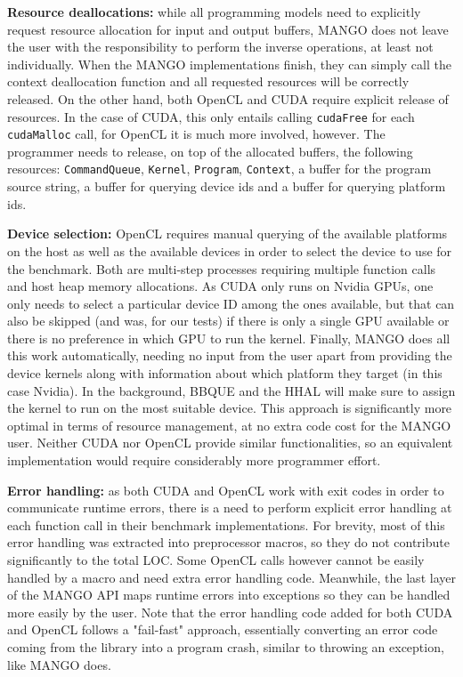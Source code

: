 \textbf{Resource deallocations:} while all programming models need to explicitly request resource allocation for input and output buffers, MANGO does not leave the user with the responsibility to perform the inverse operations, at least not individually. When the MANGO implementations finish, they can simply call the context deallocation function and all requested resources will be correctly released. On the other hand, both OpenCL and CUDA require explicit release of resources. In the case of CUDA, this only entails calling \texttt{cudaFree} for each \texttt{cudaMalloc} call, for OpenCL it is much more involved, however. The programmer needs to release, on top of the allocated buffers, the following resources: \texttt{CommandQueue}, \texttt{Kernel}, \texttt{Program}, \texttt{Context}, a buffer for the program source string, a buffer for querying device ids and a buffer for querying platform ids.

\textbf{Device selection:} OpenCL requires manual querying of the available platforms on the host as well as the available devices in order to select the device to use for the benchmark. Both are multi-step processes requiring multiple function calls and host heap memory allocations. As CUDA only runs on Nvidia GPUs, one only needs to select a particular device ID among the ones available, but that can also be skipped (and was, for our tests) if there is only a single GPU available or there is no preference in which GPU to run the kernel. Finally, MANGO does all this work automatically, needing no input from the user apart from providing the device kernels along with information about which platform they target (in this case Nvidia). In the background, BBQUE and the HHAL will make sure to assign the kernel to run on the most suitable device. This approach is significantly more optimal in terms of resource management, at no extra code cost for the MANGO user. Neither CUDA nor OpenCL provide similar functionalities, so an equivalent implementation would require considerably more programmer effort.

\textbf{Error handling:} as both CUDA and OpenCL work with exit codes in order to communicate runtime errors, there is a need to perform explicit error handling at each function call in their benchmark implementations. For brevity, most of this error handling was extracted into preprocessor macros, so they do not contribute significantly to the total LOC. Some OpenCL calls however cannot be easily handled by a macro and need extra error handling code. Meanwhile, the last layer of the MANGO API maps runtime errors into exceptions so they can be handled more easily by the user. Note that the error handling code added for both CUDA and OpenCL follows a "fail-fast" approach, essentially converting an error code coming from the library into a program crash, similar to throwing an exception, like MANGO does.

